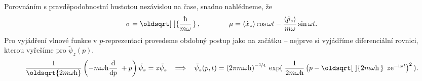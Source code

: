 \documentclass[10pt,a4paper]{article}
\renewcommand*{\sqrt}[2][\ ]{\oldsqrt[#1]{#2\,}\,}
\newcommand{\const}[1]{\text{#1}}
\newcommand{\dd}[2]{\frac{\const{d} #1}{\const{d} #2} \;}
\newcommand{\e}[1]{\const{e}^{#1}}
\renewcommand{\i}{\const{i}}
\begin{document}
Porovnáním s pravděpodobnostní hustotou nezávislou na čase, snadno nahlédneme, že
\begin{align*}
    \sigma = \sqrt{\frac{\hbar}{m\omega}},
    \hspace{4em}
    \mu = \left< \hat{x}_z \right> \cos \omega t - \frac{\left< \hat{p}_z \right>}{m\omega} \sin \omega t.
\end{align*}
Pro vyjádření vlnové funkce v $p$-reprezentaci provedeme obdobný postup jako na začátku – nejprve si vyjádříme diferenciální rovnici, kterou vyřešíme pro $\tilde{\psi}_z(p)$.
\begin{align*}
    \frac{1}{\oldsqrt{2m\omega\hbar}} \left( -m\omega\hbar\dd{}{p} + p \right) \tilde{\psi}_z = z \tilde{\psi}_z
    \;\; \implies \;\;
    \tilde{\psi}_z(p,t) = \left( 2\pi m\omega\hbar \right)^{-\nicefrac{1}{4}} \; \exp( \; \frac{1}{2m\omega\hbar}\left( p - \sqrt{2m\omega\hbar} \; z \e{-\i\omega t} \right)^2 \, ).
\end{align*}
\end{document}
